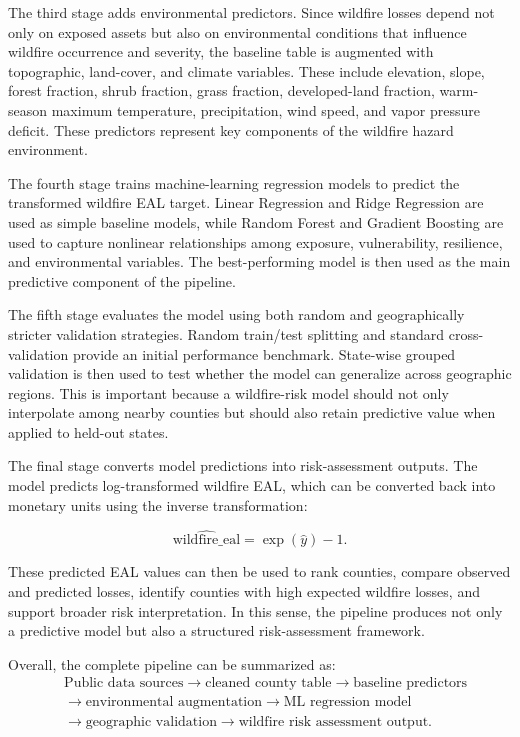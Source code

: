 The third stage adds environmental predictors. Since wildfire losses depend not only on exposed assets but also on environmental conditions that influence wildfire occurrence and severity, the baseline table is augmented with topographic, land-cover, and climate variables. These include elevation, slope, forest fraction, shrub fraction, grass fraction, developed-land fraction, warm-season maximum temperature, precipitation, wind speed, and vapor pressure deficit. These predictors represent key components of the wildfire hazard environment.

The fourth stage trains machine-learning regression models to predict the transformed wildfire EAL target. Linear Regression and Ridge Regression are used as simple baseline models, while Random Forest and Gradient Boosting are used to capture nonlinear relationships among exposure, vulnerability, resilience, and environmental variables. The best-performing model is then used as the main predictive component of the pipeline.

The fifth stage evaluates the model using both random and geographically stricter validation strategies. Random train/test splitting and standard cross-validation provide an initial performance benchmark. State-wise grouped validation is then used to test whether the model can generalize across geographic regions. This is important because a wildfire-risk model should not only interpolate among nearby counties but should also retain predictive value when applied to held-out states.

The final stage converts model predictions into risk-assessment outputs. The model predicts log-transformed wildfire EAL, which can be converted back into monetary units using the inverse transformation:

\begin{equation}
\widehat{\mathrm{wildfire\_eal}} = \exp(\hat{y}) - 1.
\end{equation}

These predicted EAL values can then be used to rank counties, compare observed and predicted losses, identify counties with high expected wildfire losses, and support broader risk interpretation. In this sense, the pipeline produces not only a predictive model but also a structured risk-assessment framework.

Overall, the complete pipeline can be summarized as:
\[
\begin{aligned}
&\text{Public data sources}
\rightarrow
\text{cleaned county table}
\rightarrow
\text{baseline predictors} \\
&\rightarrow
\text{environmental augmentation}
\rightarrow
\text{ML regression model} \\
&\rightarrow
\text{geographic validation}
\rightarrow
\text{wildfire risk assessment output}.
\end{aligned}
\]


